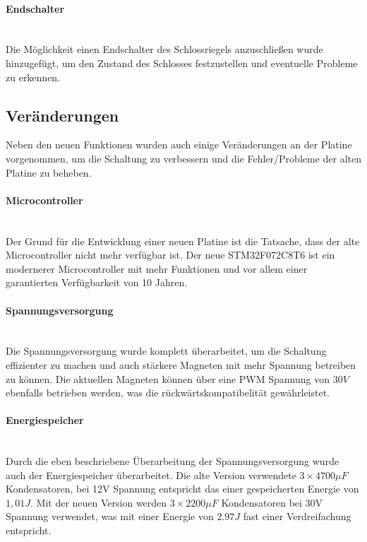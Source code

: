 \paragraph{Endschalter}\mbox{}\\
Die Möglichkeit einen Endschalter des Schlossriegels anzuschließen wurde hinzugefügt, um den Zustand des Schlosses festzustellen
und eventuelle Probleme zu erkennen.

\subsection{Veränderungen}
Neben den neuen Funktionen wurden auch einige Veränderungen an der Platine vorgenommen, um die Schaltung zu verbessern und
die Fehler/Probleme der alten Platine zu beheben.

\paragraph{Microcontroller}\mbox{}\\
Der Grund für die Entwicklung einer neuen Platine ist die Tatsache, dass der alte Microcontroller nicht mehr verfügbar ist.
Der neue STM32F072C8T6 ist ein modernerer Microcontroller mit mehr Funktionen und vor allem einer garantierten Verfügbarkeit
von 10 Jahren.

\paragraph{Spannungsversorgung}\mbox{}\\
Die Spannungsversorgung wurde komplett überarbeitet, um die Schaltung effizienter zu machen und auch stärkere Magneten mit 
mehr Spannung betreiben zu können. Die aktuellen Magneten können über eine \ac{PWM} Spannung von \(30V\) ebenfalls betrieben
werden, was die rückwärtskompatibelität gewährleistet.

\paragraph{Energiespeicher}\mbox{}\\
Durch die eben beschriebene Überarbeitung der Spannungsversorgung wurde auch der Energiespeicher überarbeitet. Die alte Version
verwendete \(3 \times 4700\mu F\) Kondensatoren, bei 12V Spannung entspricht das einer gespeicherten Energie von \(1,01J\). 
Mit der neuen Version werden \(3 \times 2200\mu F\) Kondensatoren bei 30V Spannung verwendet, was mit einer Energie von \(2.97J\) 
fast einer Verdreifachung entspricht.

